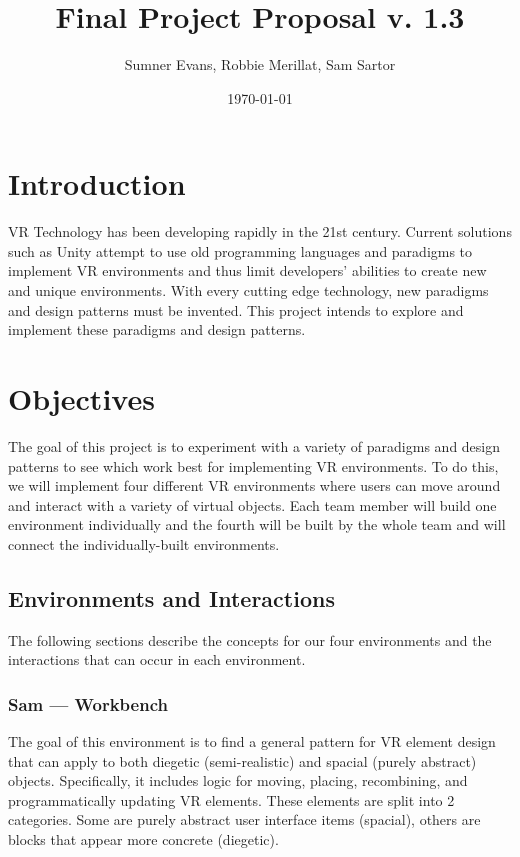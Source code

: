 \documentclass[titlepage,12pt]{article}
\title{Final Project Proposal v. 1.3}
\author{Sumner Evans, Robbie Merillat, Sam Sartor}
\date{\today}
\begin{document}
\maketitle

\section{Introduction}

VR Technology has been developing rapidly in the 21st century. Current solutions
such as Unity attempt to use old programming languages and paradigms to
implement VR environments and thus limit developers' abilities to create new and
unique environments. With every cutting edge technology, new paradigms and
design patterns must be invented. This project intends to explore and implement
these paradigms and design patterns.

\section{Objectives}

The goal of this project is to experiment with a variety of paradigms and design
patterns to see which work best for implementing VR environments. To do this, we
will implement four different VR environments where users can move around and
interact with a variety of virtual objects. Each team member will build one
environment individually and the fourth will be built by the whole team and will
connect the individually-built environments.

\subsection{Environments and Interactions}
The following sections describe the concepts for our four environments and the
interactions that can occur in each environment.


\subsubsection{Sam --- Workbench} The goal of this environment is to find a
general pattern for VR element design that can apply to both diegetic
(semi-realistic) and spacial (purely abstract) objects. Specifically, it
includes logic for moving, placing, recombining, and programmatically updating
VR elements. These elements are split into 2 categories. Some are purely
abstract user interface items (spacial), others are blocks that appear more
concrete (diegetic).
\end{document}
